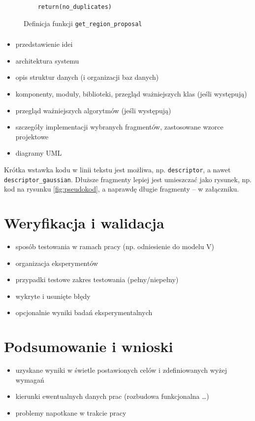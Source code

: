 \documentclass[a4paper,twoside,12pt]{book}
\begin{document}
{\begin{figure}
\begin{lstlisting}
    return(no_duplicates)
\end{lstlisting}
\caption{Definicja funkcji  \lstinline|get_region_proposal|}
\label{search}
\end{figure}
\subsection{}

\begin{itemize}
\item przedstawienie idei
\item architektura systemu
\item opis struktur danych (i organizacji baz danych)
\item komponenty, moduły, biblioteki, przegląd ważniejszych klas (jeśli występują)
\item przegląd ważniejszych algorytmów (jeśli występują)
\item szczegóły implementacji wybranych fragmentów, zastosowane wzorce projektowe
\item diagramy UML
\end{itemize}



Krótka wstawka kodu w linii tekstu jest możliwa, np. \lstinline|descriptor|, a nawet \lstinline|descriptor_gaussian|. 
Dłuższe fragmenty lepiej jest umieszczać jako rysunek, np. kod na rysunku \ref{fig:pseudokod}, a naprawdę długie fragmenty – w załączniku.



\chapter{Weryfikacja i walidacja}
\begin{itemize}
\item sposób testowania w ramach pracy (np. odniesienie do modelu V)
\item organizacja eksperymentów
\item przypadki testowe zakres testowania (pełny/niepełny)
\item wykryte i usunięte błędy
\item opcjonalnie wyniki badań eksperymentalnych
\end{itemize}
 


\chapter{Podsumowanie i wnioski}
\begin{itemize}
\item uzyskane wyniki w świetle postawionych celów i zdefiniowanych wyżej wymagań
\item kierunki ewentualnych danych prac (rozbudowa funkcjonalna …)
\item problemy napotkane w trakcie pracy
\end{itemize}


}
\end{document}
